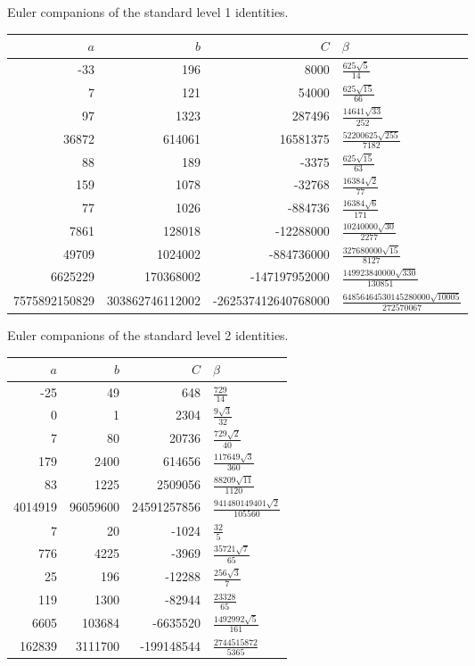 \begin{identitytable}\centering\footnotesize
\caption{Euler companions of the standard level 1 identities.}
\label{tab:euler1}
\setlength{\tabcolsep}{3pt}
\begin{tabular}{@{}rrrl@{}}\toprule
$a$ & $b$ & $C$ & $\beta$\\\midrule
-33&196&8000&$\frac{625 \sqrt{5}}{14}$\\
7&121&54000&$\frac{625 \sqrt{15}}{66}$\\
97&1323&287496&$\frac{14641 \sqrt{33}}{252}$\\
36872&614061&16581375&$\frac{52200625 \sqrt{255}}{7182}$\\
88&189&-3375&$\frac{625 \sqrt{15}}{63}$\\
159&1078&-32768&$\frac{16384 \sqrt{2}}{77}$\\
77&1026&-884736&$\frac{16384 \sqrt{6}}{171}$\\
7861&128018&-12288000&$\frac{10240000 \sqrt{30}}{2277}$\\
49709&1024002&-884736000&$\frac{327680000 \sqrt{15}}{8127}$\\
6625229&170368002&-147197952000&$\frac{149923840000 \sqrt{330}}{130851}$\\
7575892150829&303862746112002&-262537412640768000&$\frac{64856464530145280000 \sqrt{10005}}{272570067}$\\
\bottomrule\end{tabular}\end{identitytable}
\begin{identitytable}\centering\footnotesize
\caption{Euler companions of the standard level 2 identities.}
\label{tab:euler2}
\setlength{\tabcolsep}{3pt}
\begin{tabular}{@{}rrrl@{}}\toprule
$a$ & $b$ & $C$ & $\beta$\\\midrule
-25&49&648&$\frac{729}{14}$\\
0&1&2304&$\frac{9 \sqrt{3}}{32}$\\
7&80&20736&$\frac{729 \sqrt{2}}{40}$\\
179&2400&614656&$\frac{117649 \sqrt{3}}{360}$\\
83&1225&2509056&$\frac{88209 \sqrt{11}}{1120}$\\
4014919&96059600&24591257856&$\frac{941480149401 \sqrt{2}}{105560}$\\
7&20&-1024&$\frac{32}{5}$\\
776&4225&-3969&$\frac{35721 \sqrt{7}}{65}$\\
25&196&-12288&$\frac{256 \sqrt{3}}{7}$\\
119&1300&-82944&$\frac{23328}{65}$\\
6605&103684&-6635520&$\frac{1492992 \sqrt{5}}{161}$\\
162839&3111700&-199148544&$\frac{2744515872}{5365}$\\
\bottomrule\end{tabular}\end{identitytable}
